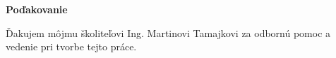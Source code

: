 
\thispagestyle{empty}
\mbox{}\vfill
\textbf{\Large Poďakovanie}

\noindent Ďakujem môjmu školiteľovi Ing. Martinovi Tamajkovi za odbornú pomoc a vedenie pri tvorbe tejto práce.
\\
\\
\\

\newpage\null\thispagestyle{empty}\newpage

